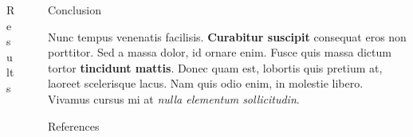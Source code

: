 \documentclass[final]{beamer}
\newlength{\sepwid}
\newlength{\onecolwid}
\newlength{\twocolwid}
\begin{document}
\begin{frame}[t]
\begin{columns}[t]
\begin{column}{\twocolwid}
\begin{columns}[t,totalwidth=\twocolwid]
\begin{column}{\onecolwid}
\begin{block}{Results}
					\end{block}


				\end{column} %

			\end{columns} %

		\end{column} %

		\begin{column}{\sepwid}\end{column} %

		\begin{column}{\onecolwid} %


			\begin{block}{Conclusion}

				Nunc tempus venenatis facilisis. \textbf{Curabitur suscipit} consequat eros non porttitor. Sed a massa dolor, id ornare enim. Fusce quis massa dictum tortor \textbf{tincidunt mattis}. Donec quam est, lobortis quis pretium at, laoreet scelerisque lacus. Nam quis odio enim, in molestie libero. Vivamus cursus mi at \textit{nulla elementum sollicitudin}.

			\end{block}



			\begin{block}{References}

				\nocite{*} %
				\small{
					\vspace{0.75in}}

			\end{block}



\end{column}
\end{columns}
\end{frame}
\end{document}
